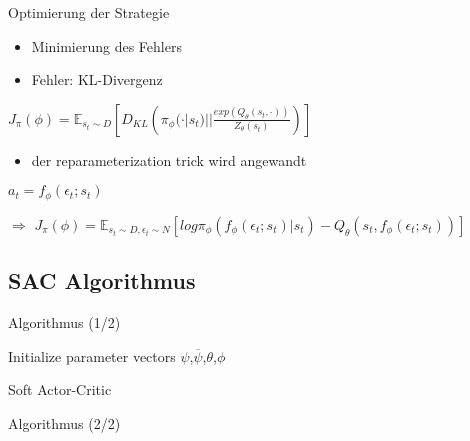 \begin{frame}{Optimierung der Strategie}
\begin{itemize}
\item Minimierung des Fehlers
\item Fehler: KL-Divergenz
\end{itemize}
$J_{\pi}(\phi)=\mathbb{E}_{s_{t}\sim D}\left[D_{KL}\left(\pi_{\phi}(\cdot | s_{t})||\frac{exp(Q_{\theta}(s_{t},\cdot))}{Z_{\theta}(s_{t})}\right)\right]$
\begin{itemize}
\item der reparameterization trick wird angewandt
\end{itemize}
$a_{t}=f_{\phi}(\epsilon_{t};s_{t})$

$\Rightarrow$
$J_{\pi}(\phi)=\mathbb{E}_{s_{t}\sim D,\epsilon_{t}\sim N}\left[log\pi_{\phi}(f_{\phi}(\epsilon_{t};s_{t})|s_{t})-Q_{\theta}(s_{t},f_{\phi}(\epsilon_{t};s_{t}))\right]$
\end{frame}

\subsection{SAC Algorithmus}

\begin{frame}{Algorithmus (1/2)}
\begin{algorithm}[H]
\SetAlgoLined

Initialize parameter vectors $\psi$,$\overline{\psi}$,$\theta$,$\phi$\\
 \caption{Soft Actor-Critic}
\end{algorithm}
\end{frame}

\begin{frame}{Algorithmus (2/2)}

\end{frame}






